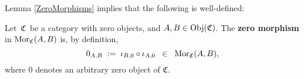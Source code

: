 \vskip 0.5cm
\noindent
Lemma \ref{ZeroMorphisms} implies that the following is well-defined:


\vskip 0.5cm
\begin{definition}
\mbox{}
\vskip 0.15cm
\noindent
Let \,$\mathfrak{C}$\, be a category with zero objects, and $A, B \in \textnormal{Obj}(\mathfrak{C})$.
The \textbf{zero morphism} in $\textnormal{Mor}_{\mathfrak{C}}(A,B)$ is, by definition,
\begin{equation*}
0_{A,B}
\; := \;
	\iota_{B,0} \circ \iota_{A,0}
\;\; \in \;\;
	\textnormal{Mor}_{\mathfrak{C}}(A,B),
\end{equation*}
where $0$ denotes an arbitrary zero object of $\mathfrak{C}$.
\end{definition}



